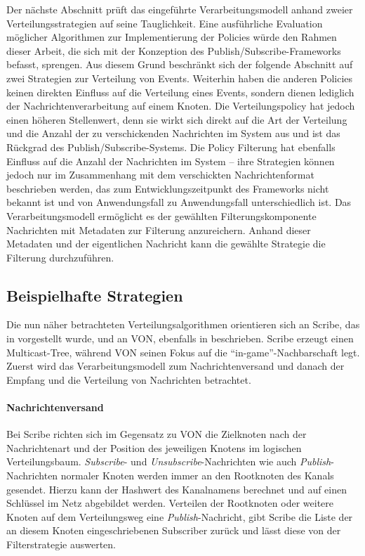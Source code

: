 Der nächste Abschnitt prüft das eingeführte Verarbeitungsmodell anhand zweier Verteilungsstrategien auf seine Tauglichkeit. Eine ausführliche Evaluation möglicher Algorithmen zur Implementierung der Policies würde den Rahmen dieser Arbeit, die sich mit der Konzeption des Publish/Subscribe-Frameworks befasst, sprengen. Aus diesem Grund beschränkt sich der folgende Abschnitt auf zwei Strategien zur Verteilung von Events. Weiterhin haben die anderen Policies keinen direkten Einfluss auf die Verteilung eines Events, sondern dienen lediglich der Nachrichtenverarbeitung auf einem Knoten. Die Verteilungspolicy hat jedoch einen höheren Stellenwert, denn sie wirkt sich direkt auf die Art der Verteilung und die Anzahl der zu verschickenden Nachrichten im System aus und ist das Rückgrad des Publish/Subscribe-Systems. Die Policy Filterung hat ebenfalls Einfluss auf die Anzahl der Nachrichten im System -- ihre Strategien können jedoch nur im Zusammenhang mit dem verschickten Nachrichtenformat beschrieben werden, das zum Entwicklungszeitpunkt des Frameworks nicht bekannt ist und von Anwendungsfall zu Anwendungsfall unterschiedlich ist. Das Verarbeitungsmodell ermöglicht es der gewählten Filterungskomponente Nachrichten mit Metadaten zur Filterung anzureichern. Anhand dieser Metadaten und der eigentlichen Nachricht kann die gewählte Strategie die Filterung durchzuführen.

\subsection*{Beispielhafte Strategien}
Die nun näher betrachteten Verteilungsalgorithmen orientieren sich an Scribe, das in  vorgestellt wurde, und an VON, ebenfalls in  beschrieben. Scribe erzeugt einen Multicast-Tree, während VON seinen Fokus auf die \enquote{in-game}-Nachbarschaft legt. Zuerst wird das Verarbeitungsmodell zum Nachrichtenversand und danach der Empfang und die Verteilung von Nachrichten betrachtet.

\paragraph*{Nachrichtenversand}
Bei Scribe richten sich im Gegensatz zu VON die Zielknoten nach der Nachrichtenart und der Position des jeweiligen Knotens im logischen Verteilungsbaum. \emph{Subscribe}- und \emph{Unsubscribe}-Nachrichten wie auch \emph{Publish}-Nachrichten normaler Knoten werden immer an den Rootknoten des Kanals gesendet. Hierzu kann der Hashwert des Kanalnamens berechnet und auf einen Schlüssel im Netz abgebildet werden. Verteilen der Rootknoten oder weitere Knoten auf dem Verteilungsweg eine \emph{Publish}-Nachricht, gibt Scribe die Liste der an diesem Knoten eingeschriebenen Subscriber zurück und lässt diese von der Filterstrategie auswerten.

